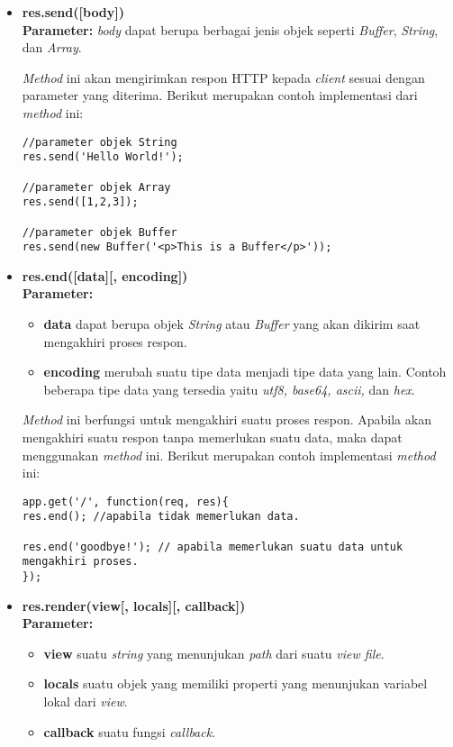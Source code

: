 \begin{itemize}
	\item \textbf{res.send([body])} \\ \textbf{Parameter:} \textit{body} dapat berupa berbagai jenis objek seperti \textit{Buffer}, \textit{String}, dan \textit{Array}.
	
	\textit{Method} ini akan mengirimkan respon HTTP kepada \textit{client} sesuai dengan parameter yang diterima. Berikut merupakan contoh implementasi dari \textit{method} ini:
\begin{lstlisting}
//parameter objek String
res.send('Hello World!');
	
//parameter objek Array
res.send([1,2,3]);
	
//parameter objek Buffer
res.send(new Buffer('<p>This is a Buffer</p>'));
\end{lstlisting}
	
	\item \textbf{res.end([data][, encoding])} \\ \textbf{Parameter:}
	\begin{itemize}
		\item \textbf{data} dapat berupa objek \textit{String} atau \textit{Buffer} yang akan dikirim saat mengakhiri proses respon.
		\item \textbf{encoding} merubah suatu tipe data menjadi tipe data yang lain. Contoh beberapa tipe data yang tersedia yaitu \textit{utf8, base64, ascii, } dan \textit{hex}.
	\end{itemize}
	
	\textit{Method} ini berfungsi untuk mengakhiri suatu proses respon. Apabila akan mengakhiri suatu respon tanpa memerlukan suatu data, maka dapat menggunakan \textit{method} ini. Berikut merupakan contoh implementasi \textit{method} ini:
\begin{lstlisting}
app.get('/', function(req, res){
res.end(); //apabila tidak memerlukan data.
	
res.end('goodbye!'); // apabila memerlukan suatu data untuk mengakhiri proses.
});
\end{lstlisting}
	
	\item \textbf{res.render(view[, locals][, callback])} \\ \textbf{Parameter:}
	\begin{itemize}
		\item \textbf{view} suatu \textit{string} yang menunjukan \textit{path} dari suatu \textit{view file}.
		\item \textbf{locals} suatu objek yang memiliki properti yang menunjukan variabel lokal dari \textit{view}.
		\item \textbf{callback} suatu fungsi \textit{callback}. 
	\end{itemize}
	

\end{itemize}
